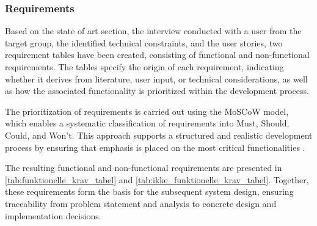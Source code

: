 \subsubsection{Requirements}
Based on the state of art section, the interview conducted with a user from the target group, the identified technical constraints, and the user stories, two requirement tables have been created, consisting of functional and non-functional requirements. The tables specify the origin of each requirement, indicating whether it derives from literature, user input, or technical considerations, as well as how the associated functionality is prioritized within the development process.

The prioritization of requirements is carried out using the MoSCoW model, which enables a systematic classification of requirements into Must, Should, Could, and Won't. This approach supports a structured and realistic development process by ensuring that emphasis is placed on the most critical functionalities \cite{noauthor_moscow_nodate}.

The resulting functional and non-functional requirements are presented in \autoref{tab:funktionelle_krav_tabel} and \autoref{tab:ikke_funktionelle_krav_tabel}. Together, these requirements form the basis for the subsequent system design, ensuring traceability from problem statement and analysis to concrete design and implementation decisions.


\renewcommand{\arraystretch}{1.3}

